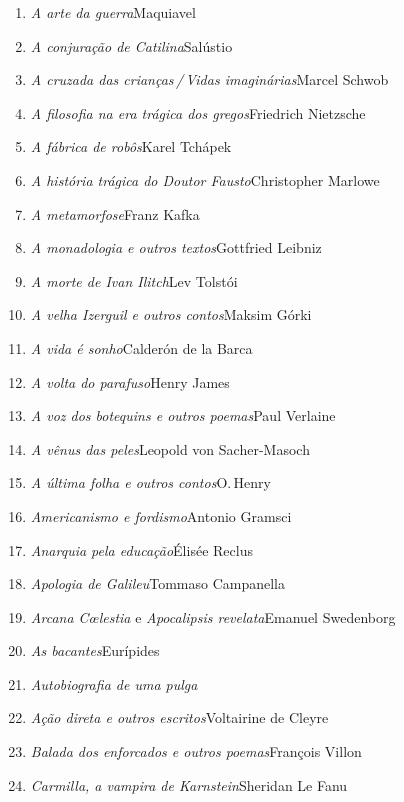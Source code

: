 \begin{enumerate}
\setlength\parskip{4.2pt}
\setlength\itemsep{-1.4mm}
\item \textit{A arte da guerra}\quad Maquiavel
\item \textit{A conjuração de Catilina}\quad Salústio
\item \textit{A cruzada das crianças\,/\,Vidas imaginárias}\quad Marcel Schwob
\item \textit{A filosofia na era trágica dos gregos}\quad Friedrich Nietzsche
\item \textit{A fábrica de robôs}\quad Karel Tchápek 
\item \textit{A história trágica do Doutor Fausto}\quad Christopher Marlowe
\item \textit{A metamorfose}\quad Franz Kafka
\item \textit{A monadologia e outros textos}\quad Gottfried Leibniz
\item \textit{A morte de Ivan Ilitch}\quad Lev Tolstói 
\item \textit{A velha Izerguil e outros contos}\quad Maksim Górki
\item \textit{A vida é sonho}\quad Calderón de la Barca
\item \textit{A volta do parafuso}\quad Henry James
\item \textit{A voz dos botequins e outros poemas}\quad Paul Verlaine 
\item \textit{A vênus das peles}\quad Leopold von Sacher{}-Masoch
\item \textit{A última folha e outros contos}\quad O.\,Henry
\item \textit{Americanismo e fordismo}\quad Antonio Gramsci
\item \textit{Anarquia pela educação}\quad Élisée Reclus 
\item \textit{Apologia de Galileu}\quad Tommaso Campanella 
\item \textit{Arcana C\oe lestia} e \textit{Apocalipsis revelata}\quad Emanuel Swedenborg
\item \textit{As bacantes}\quad Eurípides
\item \textit{Autobiografia de uma pulga}
\item \textit{Ação direta e outros escritos}\quad Voltairine de Cleyre
\item \textit{Balada dos enforcados e outros poemas}\quad François Villon
\item \textit{Carmilla, a vampira de Karnstein}\quad Sheridan Le Fanu

\end{enumerate}
